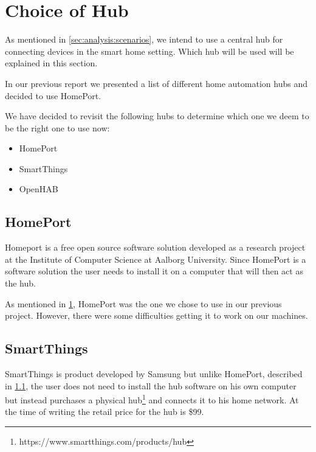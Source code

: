 \section{Choice of Hub}
\label{sec:analysis:choice-of-hub}

As mentioned in \cref{sec:analysis:scenarios}, we intend to use a central hub for connecting devices in the smart home setting. Which hub will be used will be explained in this section.

In our previous report \cite{prespecialisation} we presented a list of different home automation hubs and decided to use HomePort.

We have decided to revisit the following hubs to determine which one we deem to be the right one to use now:

\begin{itemize}
    \item HomePort
    \item SmartThings
    \item OpenHAB
\end{itemize}

\subsection{HomePort}
\label{sec:analysis:choice-of-hub:homeport}

Homeport \cite{HOMEPORT10,homeport:github} is a free open source software solution developed as a research project at the Institute of Computer Science at Aalborg University.
Since HomePort is a software solution the user needs to install it on a computer that will then act as the hub.

As mentioned in \cref{sec:analysis:choice-of-hub}, HomePort was the one we chose to use in our previous project. However, there were some difficulties getting it to work on our machines.

\subsection{SmartThings}
\label{sec:analysis:choice-of-hub:smartthings}

SmartThings \cite{SMARTTHINGS} is product developed by Samsung but unlike HomePort, described in \cref{sec:analysis:choice-of-hub:homeport}, the user does not need to install the hub software on his own computer but instead purchases a physical hub\footnote{https://www.smartthings.com/products/hub} and connects it to his home network.
At the time of writing the retail price for the hub is \$99.

